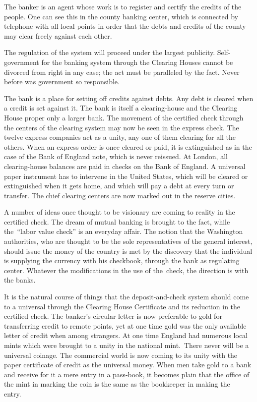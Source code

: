 \documentclass[openany,nobib]{tufte-book}
\begin{document}
The banker is an agent whose work is to register and certify the credits
of the people. One can see this in the county banking center, which is
connected by telephone with all local points in order that the debts and
credits of the county may clear freely against each other.~

The regulation of the system will proceed under the largest publicity.
Self-government for the banking system through the Clearing Houses
cannot be divorced from right in any case; the act must be paralleled by
the fact. Never before was government so responsible.~~

The bank is a place for setting off credits against debts. Any debt is
cleared when a credit is set against it. The bank is itself a
clearing-house and the Clearing House proper only a larger bank. The
movement of the certified check through the centers of the clearing
system may now be seen in the express check. The twelve express
companies act as a unity, any one of them clearing for all the others.
When an express order is once cleared or paid, it is extinguished as in
the case of the Bank of England note, which is never reissued. At
London, all clearing-house balances are paid in checks on the Bank of
England. A universal paper instrument has to intervene in the United
States, which will be cleared or extinguished when it gets home, and
which will pay a debt at every turn or transfer. The chief clearing
centers are now marked out in the reserve cities.~

A number of ideas once thought to be visionary are coming to reality in
the certified check. The dream of mutual banking is brought to the fact,
while the~``labor value check'' is an everyday affair. The notion that
the Washington authorities, who are thought to be the sole
representatives of the general interest, should issue the money of the
country is met by the discovery that the individual is supplying the
currency with his checkbook, through the bank as regulating center.
Whatever the modifications in the use of the~check, the direction is
with the banks.~

It is the natural course of things that the deposit-and-check system
should come to a universal through the Clearing House Certificate and
its reduction in the certified check. The banker's circular letter is
now preferable to gold for transferring credit to remote points, yet at
one time gold was the only available letter of credit when among
strangers. At one time England had numerous local mints which were
brought to a unity in the national mint.~There never will be a universal
coinage. The commercial world is now coming to its unity with the paper
certificate of credit as the universal money. When men take gold to a
bank and receive for it a mere entry in a pass-book, it becomes plain
that the office of the mint in marking the coin is the same as the
bookkeeper in making the entry.~~
\end{document}
